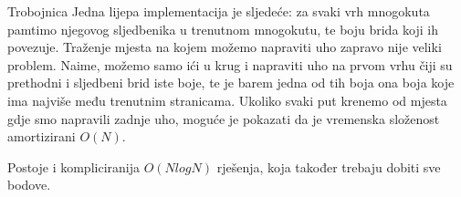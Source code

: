 \begin{statement}[
  problempoints=110,
  timelimit=1 second,
  memorylimit=512 MiB,
]{Trobojnica}
Jedna lijepa implementacija je sljedeće: za svaki vrh mnogokuta pamtimo njegovog sljedbenika u
trenutnom mnogokutu, te boju brida koji ih povezuje. Traženje mjesta na kojem možemo napraviti
uho zapravo nije veliki problem.
Naime, možemo samo ići u krug i napraviti uho na prvom vrhu čiji su prethodni i sljedbeni brid
iste boje, te je barem jedna od tih boja ona boja koje ima najviše među trenutnim stranicama.
Ukoliko svaki put krenemo od mjesta gdje smo napravili zadnje uho, moguće je pokazati da
je vremenska složenost amortizirani $O(N)$.

Postoje i kompliciranija $O(N log N)$ rješenja, koja također trebaju dobiti sve bodove.

\end{statement}

